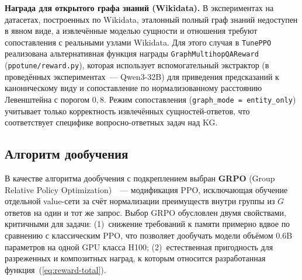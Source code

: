 \textbf{Награда для открытого графа знаний (Wikidata).} В экспериментах на датасетах, построенных по Wikidata, эталонный полный граф знаний недоступен в явном виде, а извлечённые моделью сущности и отношения требуют сопоставления с реальными узлами Wikidata. Для этого случая в \texttt{TunePPO} реализована альтернативная функция награды \texttt{GraphMultihopQAReward} (\texttt{ppotune/reward.py}), которая использует вспомогательный экстрактор (в проведённых экспериментах~--- Qwen3-32B) для приведения предсказаний к каноническому виду и сопоставление по нормализованному расстоянию Левенштейна с порогом $0{,}8$. Режим сопоставления (\texttt{graph\_mode = entity\_only}) учитывает только корректность извлечённых сущностей-ответов, что соответствует специфике вопросно-ответных задач над KG.

\subsection{Алгоритм дообучения}
\label{subsec:training-algorithm}

В качестве алгоритма дообучения с подкреплением выбран \textbf{GRPO} (Group Relative Policy Optimization)~\cite{shao2024deepseekmath}~--- модификация PPO, исключающая обучение отдельной value-сети за счёт нормализации преимуществ внутри группы из $G$ ответов на один и тот же запрос. Выбор GRPO обусловлен двумя свойствами, критичными для задачи: (1)~снижение требований к памяти примерно вдвое по сравнению с классическим PPO, что позволяет дообучать модели объёмом 0.6B параметров на одной GPU класса H100; (2)~естественная пригодность для разреженных и композитных наград, к которым относится разработанная функция~(\ref{eq:reward-total}).

